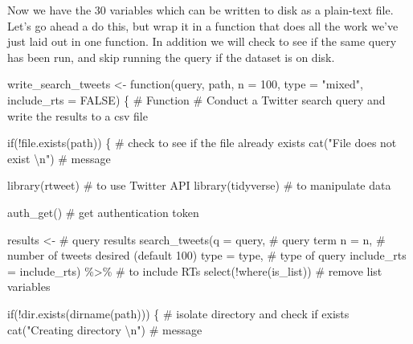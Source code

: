 \documentclass[
  letterpaper,
]{latex/krantz}
\newenvironment{Shaded}{\begin{snugshade}}{\end{snugshade}}
\newcommand{\AttributeTok}[1]{\textcolor[rgb]{0.40,0.45,0.13}{#1}}
\newcommand{\CommentTok}[1]{\textcolor[rgb]{0.37,0.37,0.37}{#1}}
\newcommand{\ConstantTok}[1]{\textcolor[rgb]{0.56,0.35,0.01}{#1}}
\newcommand{\ControlFlowTok}[1]{\textcolor[rgb]{0.00,0.23,0.31}{#1}}
\newcommand{\DecValTok}[1]{\textcolor[rgb]{0.68,0.00,0.00}{#1}}
\newcommand{\FunctionTok}[1]{\textcolor[rgb]{0.28,0.35,0.67}{#1}}
\newcommand{\NormalTok}[1]{\textcolor[rgb]{0.00,0.23,0.31}{#1}}
\newcommand{\OtherTok}[1]{\textcolor[rgb]{0.00,0.23,0.31}{#1}}
\newcommand{\SpecialCharTok}[1]{\textcolor[rgb]{0.37,0.37,0.37}{#1}}
\newcommand{\StringTok}[1]{\textcolor[rgb]{0.13,0.47,0.30}{#1}}
\begin{document}
Now we have the 30 variables which can be written to disk as a
plain-text file. Let's go ahead a do this, but wrap it in a function
that does all the work we've just laid out in one function. In addition
we will check to see if the same query has been run, and skip running
the query if the dataset is on disk.

\begin{Shaded}
\begin{Highlighting}[]
\NormalTok{write\_search\_tweets }\OtherTok{\textless{}{-}} 
  \ControlFlowTok{function}\NormalTok{(query, path, }\AttributeTok{n =} \DecValTok{100}\NormalTok{, }\AttributeTok{type =} \StringTok{"mixed"}\NormalTok{, }\AttributeTok{include\_rts =} \ConstantTok{FALSE}\NormalTok{) \{}
    \CommentTok{\# Function}
    \CommentTok{\# Conduct a Twitter search query and write the results to a csv file}
    
    \ControlFlowTok{if}\NormalTok{(}\SpecialCharTok{!}\FunctionTok{file.exists}\NormalTok{(path)) \{ }\CommentTok{\# check to see if the file already exists}
      \FunctionTok{cat}\NormalTok{(}\StringTok{"File does not exist }\SpecialCharTok{\textbackslash{}n}\StringTok{"}\NormalTok{) }\CommentTok{\# message}
      
      \FunctionTok{library}\NormalTok{(rtweet) }\CommentTok{\# to use Twitter API}
      \FunctionTok{library}\NormalTok{(tidyverse) }\CommentTok{\# to manipulate data}
      
      \FunctionTok{auth\_get}\NormalTok{() }\CommentTok{\# get authentication token}
      
\NormalTok{      results }\OtherTok{\textless{}{-}} \CommentTok{\# query results}
        \FunctionTok{search\_tweets}\NormalTok{(}\AttributeTok{q =}\NormalTok{ query, }\CommentTok{\# query term}
                      \AttributeTok{n =}\NormalTok{ n, }\CommentTok{\# number of tweets desired (default 100)}
                      \AttributeTok{type =}\NormalTok{ type, }\CommentTok{\# type of query}
                      \AttributeTok{include\_rts =}\NormalTok{ include\_rts) }\SpecialCharTok{\%\textgreater{}\%}  \CommentTok{\# to include RTs}
        \FunctionTok{select}\NormalTok{(}\SpecialCharTok{!}\FunctionTok{where}\NormalTok{(is\_list))  }\CommentTok{\# remove list variables}
      
      \ControlFlowTok{if}\NormalTok{(}\SpecialCharTok{!}\FunctionTok{dir.exists}\NormalTok{(}\FunctionTok{dirname}\NormalTok{(path))) \{ }\CommentTok{\# isolate directory and check if exists}
        \FunctionTok{cat}\NormalTok{(}\StringTok{"Creating directory }\SpecialCharTok{\textbackslash{}n}\StringTok{"}\NormalTok{) }\CommentTok{\# message}
        

\end{Highlighting}
\end{Shaded}
\end{document}
